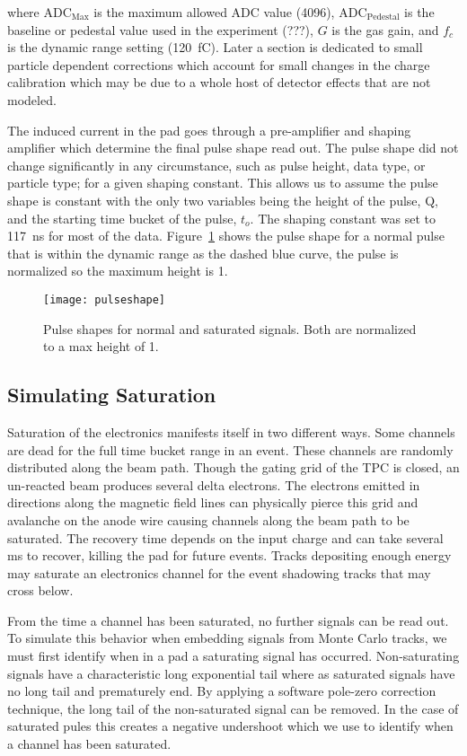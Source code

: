 where $\mathrm{ADC_{Max}}$ is the maximum allowed ADC value (4096), $\mathrm{ADC_{Pedestal}}$ is the baseline or pedestal value used in the experiment (???), $G$ is the gas gain, and $f_c$ is the dynamic range setting (\SI{120}{\femto\coulomb}). Later a section is dedicated to small particle dependent corrections which account for small changes in the charge calibration which may be due to a whole host of detector effects that are not modeled. 

The induced current in the pad goes through a pre-amplifier and shaping amplifier which determine the final pulse shape read out. The pulse shape did not change significantly in any circumstance, such as pulse height, data type, or particle type; for a given shaping constant. This allows us to assume the pulse shape is constant with the only two variables being the height of the pulse, Q, and the starting time bucket of the pulse, $t_o$. The shaping constant was set to \SI{117}{\nano\second} for most of the data. Figure~\ref{fig:pulseshape} shows the pulse shape for a normal pulse that is within the dynamic range as the dashed blue curve, the pulse is normalized so the maximum height is 1. 


\begin{figure}[!hbt]
\texttt{[image: pulseshape]}
\caption{Pulse shapes for normal and saturated signals. Both are normalized to a max height of 1.}
\label{fig:pulseshape}
\end{figure}


\subsection{Simulating Saturation}

Saturation of the electronics manifests itself in two different ways. Some channels are dead for the full time bucket range in an event. These channels are randomly distributed along the beam path. Though the gating grid of the TPC is closed, an un-reacted beam produces several delta electrons. The electrons emitted in directions along the magnetic field lines can physically pierce this grid and avalanche on the anode wire causing channels along the beam path to be saturated. The recovery time depends on the input charge and can take several ms to recover, killing the pad for future events. 
Tracks depositing enough energy may saturate an electronics channel for the event shadowing tracks that may cross below. 

From the time a channel has been saturated, no further signals can be read out. To simulate this behavior when embedding signals from Monte Carlo tracks, we must first identify when in a pad a saturating signal has occurred. Non-saturating signals have a characteristic long exponential tail where as saturated signals have no long tail and prematurely end. By applying a software pole-zero correction technique, the long tail of the non-saturated signal can be removed. In the case of saturated pules this creates a negative undershoot which we use to identify when a channel has been saturated. 

